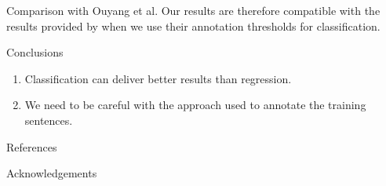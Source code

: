 \documentclass[final]{beamer}
\newlength{\onecolwid}
\begin{document}
\begin{frame}[t]
\begin{columns}[t]
\begin{column}{\onecolwid}
{\begin{alertblock}{Comparison with Ouyang et al.}
Our results are therefore compatible with the results provided by \cite{Ouyang:2011} when we use their annotation thresholds for classification.
\end{alertblock}
}

\begin{alertblock}{Conclusions}

\begin{enumerate}
\item Classification can deliver better results than regression.
\item We need to be careful with the approach used to annotate the training sentences.
\end{enumerate}

\end{alertblock}


\begin{block}{References}

\nocite{*} %
\small{
\vspace{0.75in}}

\end{block}


\vspace{-3cm}
\begin{block}{Acknowledgements}

\small{} 
\end{block}




\end{column}
\end{columns}
\end{frame}
\end{document}
